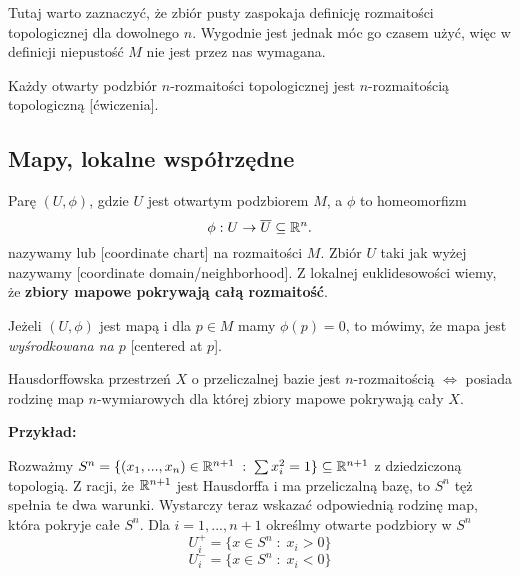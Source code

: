 Tutaj warto zaznaczyć, że zbiór pusty zaspokaja definicję rozmaitości topologicznej dla dowolnego $n$. Wygodnie jest jednak móc go czasem użyć, więc w definicji niepustość $M$ nie jest przez nas wymagana.

\begin{remark}
    Każdy otwarty podzbiór $n$-rozmaitości topologicznej jest $n$-rozmaitością topologiczną [ćwiczenia].
\end{remark}

\subsection{Mapy, lokalne współrzędne}

\begin{definition}[mapa]
    Parę $(U,\phi)$, gdzie $U$ jest otwartym podzbiorem $M$, a $\phi$ to homeomorfizm
    $$\phi:U\to\overline{U}\subseteq\mathbb{R}^n.$$
    nazywamy  lub  [coordinate chart] na rozmaitości $M$. Zbiór $U$ taki jak wyżej nazywamy  [coordinate domain/neighborhood]. Z lokalnej euklidesowości wiemy, że \textbf{zbiory mapowe pokrywają całą rozmaitość}.
\end{definition}

Jeżeli $(U,\phi)$ jest mapą i dla $p\in M$ mamy $\phi(p)=0$, to mówimy, że mapa jest \emph{wyśrodkowana na $p$} [centered at $p$].

\begin{fact}
    Hausdorffowska przestrzeń $X$ o przeliczalnej bazie jest $n$-rozmaitością $\iff$ posiada rodzinę map $n$-wymiarowych dla której zbiory mapowe pokrywają cały $X$.
\end{fact}

\textbf{Przykład:} 

Rozważmy $S^n=\{(x_1,...,x_n)\in\mathbb{R}^{n+1}\;:\;\sum x_i^2=1\}\subseteq \mathbb{R}^{n+1}$ z dziedziczoną topologią. Z racji, że $\mathbb{R}^{n+1}$ jest Hausdorffa i ma przeliczalną bazę, to $S^n$ tęż spełnia te dwa warunki. Wystarczy teraz wskazać odpowiednią rodzinę map, która pokryje całe $S^n$. Dla $i=1,..., n+1$ określmy otwarte podzbiory w $S^n$
$$U_i^+=\{x\in S^n\;:\;x_i>0\}$$
$$U_i^-=\{x\in S^n\;:\;x_i<0\}$$

